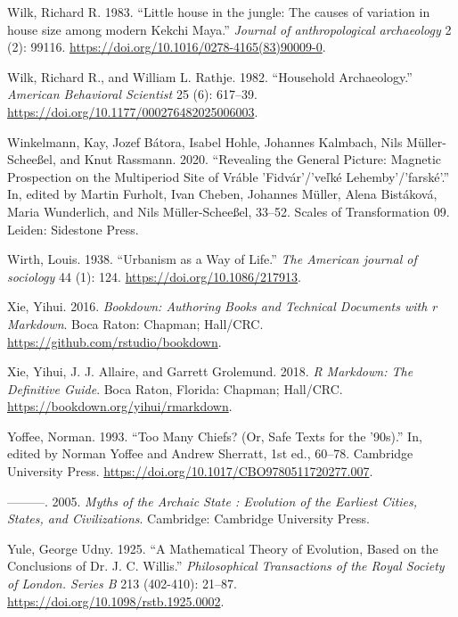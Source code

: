 \documentclass[
  12pt,
  a4paper, twoside]{book}
\newlength{\cslhangindent}
\newlength{\cslentryspacingunit} %
\newenvironment{CSLReferences}[2] %
 {%
  \setlength{\parindent}{0pt}
  \ifodd #1
  \let\oldpar\par
  \def\par{\hangindent=\cslhangindent\oldpar}
  \fi
  \setlength{\parskip}{#2\cslentryspacingunit}
 }%
 {}
\begin{document}
\begin{CSLReferences}{1}{0}
\leavevmode{}%
Wilk, Richard R. 1983. {``Little house in the jungle: The causes of variation in house size among modern Kekchi Maya.''} \emph{Journal of anthropological archaeology} 2 (2): 99116. \url{https://doi.org/10.1016/0278-4165(83)90009-0}.

\leavevmode{}%
Wilk, Richard R., and William L. Rathje. 1982. {``Household Archaeology.''} \emph{American Behavioral Scientist} 25 (6): 617--39. \url{https://doi.org/10.1177/000276482025006003}.

\leavevmode{}%
Winkelmann, Kay, Jozef Bátora, Isabel Hohle, Johannes Kalmbach, Nils Müller-Scheeßel, and Knut Rassmann. 2020. {``Revealing the General Picture: Magnetic Prospection on the Multiperiod Site of Vráble 'Fidvár'/'ve{ľ}ké Lehemby'/'farské'.''} In, edited by Martin Furholt, Ivan Cheben, Johannes Müller, Alena Bistáková, Maria Wunderlich, and Nils Müller-Scheeßel, 33--52. Scales of Transformation 09. Leiden: Sidestone Press.

\leavevmode{}%
Wirth, Louis. 1938. {``Urbanism as a Way of Life.''} \emph{The American journal of sociology} 44 (1): 124. \url{https://doi.org/10.1086/217913}.

\leavevmode{}%
Xie, Yihui. 2016. \emph{Bookdown: Authoring Books and Technical Documents with r Markdown}. Boca Raton: Chapman; Hall/CRC. \url{https://github.com/rstudio/bookdown}.

\leavevmode{}%
Xie, Yihui, J. J. Allaire, and Garrett Grolemund. 2018. \emph{R Markdown: The Definitive Guide}. Boca Raton, Florida: Chapman; Hall/CRC. \url{https://bookdown.org/yihui/rmarkdown}.

\leavevmode{}%
Yoffee, Norman. 1993. {``Too Many Chiefs? (Or, Safe Texts for the '90s).''} In, edited by Norman Yoffee and Andrew Sherratt, 1st ed., 60--78. Cambridge University Press. \url{https://doi.org/10.1017/CBO9780511720277.007}.

\leavevmode{}%
---------. 2005. \emph{Myths of the Archaic State : Evolution of the Earliest Cities, States, and Civilizations}. Cambridge: Cambridge University Press.

\leavevmode{}%
Yule, George Udny. 1925. {``A Mathematical Theory of Evolution, Based on the Conclusions of Dr. J. C. Willis.''} \emph{Philosophical Transactions of the Royal Society of London. Series B} 213 (402-410): 21--87. \url{https://doi.org/10.1098/rstb.1925.0002}.


\end{CSLReferences}
\end{document}
